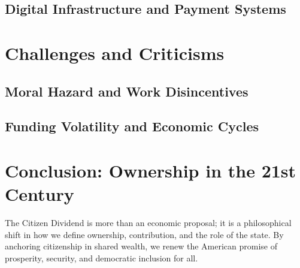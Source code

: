 \documentclass[11pt]{article}
\begin{document}
\subsection{Digital Infrastructure and Payment Systems}
\lipsum[31-32]

\section{Challenges and Criticisms}
\subsection{Moral Hazard and Work Disincentives}
\lipsum[33-34]

\subsection{Funding Volatility and Economic Cycles}
\lipsum[35-36]

\section{Conclusion: Ownership in the 21st Century}
The Citizen Dividend is more than an economic proposal; it is a philosophical shift in how we define ownership, contribution, and the role of the state. By anchoring citizenship in shared wealth, we renew the American promise of prosperity, security, and democratic inclusion for all.



\end{document}
